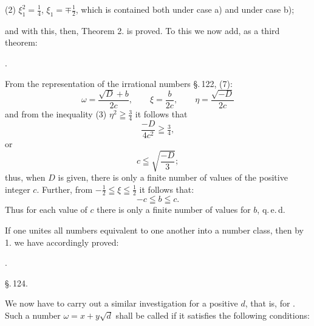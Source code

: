 

(2) $\xi_1^2 = \tfrac{1}{4}$, $\xi_1 = \mp\tfrac{1}{2}$, which is contained both under case a) and under
case b);

and with this, then, Theorem 2. is proved. To this we now add, as a
third theorem:

.\quad {}

From the representation of the irrational numbers \S.\,122, (7):
\[
\omega = \dfrac{\sqrt{D}+b}{2c}, \qquad \xi = \dfrac{b}{2c}, \qquad \eta = \dfrac{\sqrt{-D}}{2c}
\]
and from the inequality (3) $\eta^2 \geqq \tfrac{3}{4}$ it follows that
\[
\dfrac{-D}{4c^2} \geqq \tfrac{3}{4},
\]
or
\[
c \leqq \sqrt{\dfrac{-D}{3}};
\]
thus, when $D$ is given, there is only a finite number of values
of the positive integer $c$. Further, from $-\tfrac{1}{2} \leqq \xi \leqq \tfrac{1}{2}$ it follows that:
\[
-c \leqq b \leqq c.
\]
Thus for each value of $c$ there is only a finite number of values
for $b$, q.\,e.\,d.

If one unites all numbers equivalent to one another into a
number class, then by 1. we have accordingly proved:

.\quad {}

\begin{center}
\S.\,124.

\end{center}

We now have to carry out a similar investigation for a
positive $d$, that is, for . Such a
number $\omega = x + y\sqrt{d}$ shall be called  if it satisfies the following
conditions:
